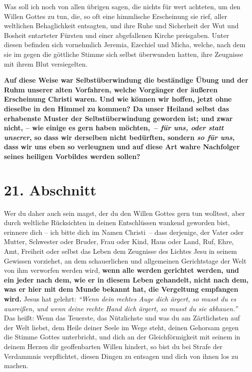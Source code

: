Was soll ich noch von allen übrigen sagen, die nichts für wert achteten, um den
Willen Gottes zu tun, die, so oft eine himmlische Erscheinung sie rief, aller
weltlichen Behaglichkeit entsagten, und ihre Ruhe und Sicherheit der Wut und
Bosheit entarteter Fürsten und einer abgefallenen Kirche
preisgaben. Unter
diesen befinden sich vornehmlich Jeremia, Ezechiel
 und Micha, welche, nach dem
sie im gegen die göttliche Stimme sich selbst
überwunden hatten, ihre Zeugnisse
mit ihrem Blut versiegelten.

\medskip

\label{ref:04_20_opfertod}
 \textbf{Auf diese Weise war
Selbstüberwindung
die beständige Übung und der Ruhm
unserer alten Vorfahren, welche Vorgänger der äußeren Erscheinung Christi waren.
Und wie können wir hoffen, jetzt ohne dieselbe in den Himmel
 zu kommen? Da
unser Heiland selbst das erhabenste Muster der
Selbstüberwindung geworden ist;
und zwar nicht, -- wie einige es gern haben möchten,~-- \textit{für uns, oder
statt
unserer}, so dass wir derselben nicht bedürften, sondern \textit{so für uns},
dass
wir uns eben so verleugnen und auf diese Art wahre Nachfolger seines heiligen
Vorbildes werden sollen?}

\section{21. Abschnitt} \label{kap4_ab21}

Wer du daher auch sein magst, der du den Willen Gottes gern tun wolltest, aber
durch weltliche Rücksichten in deinen Entschlüssen wankend geworden bist,
erinnere dich -- ich bitte dich im Namen Christi~-- dass derjenige, der Vater
oder
Mutter, Schwester oder Bruder, Frau oder Kind, Haus oder Land, Ruf, Ehre, Amt,
Freiheit oder selbst das Leben dem Zeugnisse des Lichtes Jesu
in seinem
Gewissen vorziehet, an dem schauerlichen und allgemeinen Gerichtstage
 der Welt \label{ref:04_21_gericht}
von ihm verworfen werden wird, \textbf{wenn alle werden gerichtet werden, und
ein jeder
nach dem, wie er in diesem Leben gehandelt, nicht nach dem, was er hier mit dem
Munde bekannt hat, die Vergeltung empfangen wird.} Jesus hat
gelehrt:
\textit{"`Wenn
dein rechtes Auge dich ärgert, so musst du es ausreißen, und wenn deine rechte
Hand dich ärgert, so musst du sie abhauen."'}
Das heißt:
Wenn das Teuerste, das Nützlichste und was du am Zärtlichsten auf der Welt
liebst, dem Heile deiner Seele im Wege steht, deinen Gehorsam gegen die Stimme
Gottes unterbricht, und dich an der Gleichförmigkeit mit seinem in deinem Herzen
dir geoffenbarten Willen hindert, so bist du bei Strafe der Verdammnis
verpflichtet, diesen Dingen zu entsagen und dich von ihnen los zu machen.

